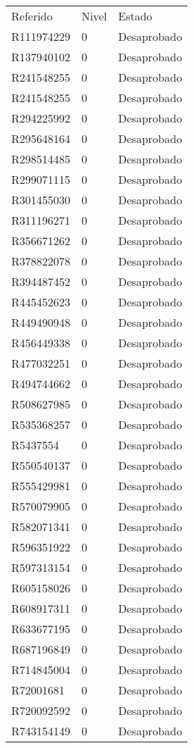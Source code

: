 \documentclass[a4paper,12pt]{article}
\begin{document}
\begin{tabular}{l l l}
Referido & Nivel & Estado \\
R111974229 & 0 & Desaprobado \\
R137940102 & 0 & Desaprobado \\
R241548255 & 0 & Desaprobado \\
R241548255 & 0 & Desaprobado \\
R294225992 & 0 & Desaprobado \\
R295648164 & 0 & Desaprobado \\
R298514485 & 0 & Desaprobado \\
R299071115 & 0 & Desaprobado \\
R301455030 & 0 & Desaprobado \\
R311196271 & 0 & Desaprobado \\
R356671262 & 0 & Desaprobado \\
R378822078 & 0 & Desaprobado \\
R394487452 & 0 & Desaprobado \\
R445452623 & 0 & Desaprobado \\
R449490948 & 0 & Desaprobado \\
R456449338 & 0 & Desaprobado \\
R477032251 & 0 & Desaprobado \\
R494744662 & 0 & Desaprobado \\
R508627985 & 0 & Desaprobado \\
R535368257 & 0 & Desaprobado \\
R5437554 & 0 & Desaprobado \\
R550540137 & 0 & Desaprobado \\
R555429981 & 0 & Desaprobado \\
R570079905 & 0 & Desaprobado \\
R582071341 & 0 & Desaprobado \\
R596351922 & 0 & Desaprobado \\
R597313154 & 0 & Desaprobado \\
R605158026 & 0 & Desaprobado \\
R608917311 & 0 & Desaprobado \\
R633677195 & 0 & Desaprobado \\
R687196849 & 0 & Desaprobado \\
R714845004 & 0 & Desaprobado \\
R72001681 & 0 & Desaprobado \\
R720092592 & 0 & Desaprobado \\
R743154149 & 0 & Desaprobado \\

\end{tabular}
\end{document}
